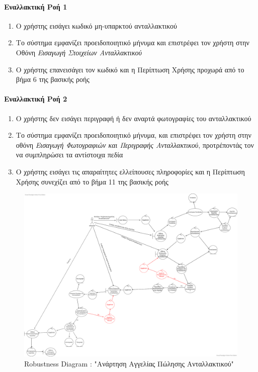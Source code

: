 \documentclass{../ol-softwaremanual}
\begin{document}
	
	\paragraph{Εναλλακτική Ροή 1}
	
	\begin{enumerate}
		\item Ο χρήστης εισάγει κωδικό μη-υπαρκτού ανταλλακτικού
		\item Το σύστημα εμφανίζει προειδοποιητικό μήνυμα και επιστρέφει τον χρήστη στην Οθόνη \textit{Εισαγωγή Στοιχείων Ανταλλακτικού}
		\item Ο χρήστης επανεισάγει τον κωδικό και η Περίπτωση Χρήσης προχωρά από το βήμα 6 της βασικής ροής
	\end{enumerate}
	
	\paragraph{Εναλλακτική Ροή 2}
	
	\begin{enumerate}
		\item Ο χρήστης δεν εισάγει περιγραφή ή δεν αναρτά φωτογραφίες του ανταλλακτικού
		\item Το σύστημα εμφανίζει προειδοποιητικό μήνυμα, και επιστρέφει τον χρήστη στην οθόνη \textit{Εισαγωγή Φωτογραφιών και Περιγραφής Ανταλλακτικού}, προτρέποντάς τον να συμπληρώσει τα αντίστοιχα πεδία
		\item Ο χρήστης εισάγει τις απαραίτητες ελλείπουσες πληροφορίες και η Περίπτωση Χρήσης συνεχίζει από το βήμα 11 της βασικής ροής
	\end{enumerate}
	
	\begin{figure}[htbp!]
		\includegraphics[scale=0.245]{img/rob_spare_part_listing.png}
		\caption{\en Robustness Diagram : "\gr Ανάρτηση Αγγελίας Πώλησης Ανταλλακτικού\en"\gr}
	\end{figure}
	
\end{document}
